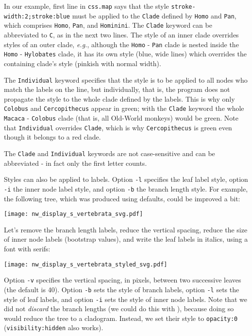In our example, first line in \texttt{css.map} says that the style
\texttt{stroke-width:2;stroke:blue} must be applied to the \texttt{Clade}
defined by \texttt{Homo} and \texttt{Pan}, which comprises \texttt{Homo},
\texttt{Pan}, and \texttt{Hominini}. The \texttt{Clade} keyword can be
abbreviated to \texttt{C}, as in the next two lines. The style of an inner
clade overrides styles of an outer clade, \textit{e.g.}, although the
\texttt{Homo} - \texttt{Pan} clade is nested inside the \texttt{Homo} -
\texttt{Hylobates} clade, it has its own style (blue, wide lines) which
overrides the containing clade's style (pinkish with normal width).

The \texttt{Individual} keyword specifies that the style is to be applied to all nodes who match the labels on the line, but individually, that is, the program does not propagate the style to the whole clade defined by the labels. This is why only \texttt{Colobus} and \texttt{Cercopithecus} appear in green; with the \texttt{Clade} keyword the whole \texttt{Macaca} - \texttt{Colobus} clade (that is, all Old-World monkeys) would be green. Note that \texttt{Individual} overrides \texttt{Clade}, which is why \texttt{Cercopithecus} is green even though it belongs to a red clade.

The \texttt{Clade} and \texttt{Individual} keywords are not case-sensitive and can be abbreviated - in fact only the first letter counts.

Styles can also be applied to labels. Option \texttt{-l} specifies the leaf
label style, option \texttt{-i} the inner node label style, and option
\texttt{-b} the branch length style. For example, the following tree, which was
produced using defaults, could be improved a bit:


\begin{center}
  \texttt{[image: nw\_display\_s\_vertebrata\_svg.pdf]}
\end{center}

\noindent{}Let's remove the branch length labels, reduce
the vertical spacing, reduce the size of inner node labels (bootstrap values),
and write the leaf labels in italics, using a font with serifs:

\begin{center}
  \texttt{[image: nw\_display\_s\_vertebrata\_styled\_svg.pdf]}
\end{center}
Option \texttt{-v} specifies the vertical spacing, in pixels, between two
successive leaves (the default is 40). Option \texttt{-b} sets the style of
branch labels, option \texttt{-l} sets the style of leaf labels, and option
\texttt{-i} sets the style of inner node labels. Note that we did not
\emph{discard} the branch lengths (we could do this with \topology), because
doing so would reduce the tree to a cladogram. Instead, we set their \css{}
style to \texttt{opacity:0} (\texttt{visibility:hidden} also works).

